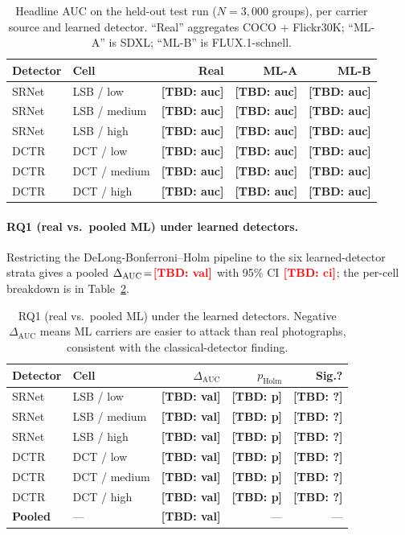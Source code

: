 \documentclass[10pt,twocolumn,a4paper]{article}
\newcommand{\TBD}[1]{\textbf{\color{red}[TBD: #1]}}
\begin{document}
\begin{table}[h]
\centering\small
\caption{Headline AUC on the held-out test run ($N\!=\!3{,}000$ groups), per carrier source and learned detector. ``Real'' aggregates COCO + Flickr30K; ``ML-A'' is SDXL; ``ML-B'' is FLUX.1-schnell.}
\label{tab:learned-headline-auc}
\setlength{\tabcolsep}{6pt}\renewcommand{\arraystretch}{1.1}
\begin{tabular}{@{}llrrr@{}}
\toprule
\textbf{Detector} & \textbf{Cell} & \textbf{Real} & \textbf{ML-A} & \textbf{ML-B} \\
\midrule
SRNet & LSB / low     & \TBD{auc} & \TBD{auc} & \TBD{auc} \\
SRNet & LSB / medium  & \TBD{auc} & \TBD{auc} & \TBD{auc} \\
SRNet & LSB / high    & \TBD{auc} & \TBD{auc} & \TBD{auc} \\
DCTR  & DCT / low     & \TBD{auc} & \TBD{auc} & \TBD{auc} \\
DCTR  & DCT / medium  & \TBD{auc} & \TBD{auc} & \TBD{auc} \\
DCTR  & DCT / high    & \TBD{auc} & \TBD{auc} & \TBD{auc} \\
\bottomrule
\end{tabular}
\end{table}

\paragraph{RQ1 (real vs.\ pooled ML) under learned detectors.} Restricting the DeLong-Bonferroni--Holm pipeline to the six learned-detector strata gives a pooled $\Delta_\text{AUC}\!=\!\TBD{val}$ with 95\% CI $\TBD{ci}$; the per-cell breakdown is in Table~\ref{tab:learned-rq1}.

\begin{table}[h]
\centering\small
\caption{RQ1 (real vs.\ pooled ML) under the learned detectors. Negative $\Delta_\text{AUC}$ means ML carriers are easier to attack than real photographs, consistent with the classical-detector finding.}
\label{tab:learned-rq1}
\setlength{\tabcolsep}{4pt}\renewcommand{\arraystretch}{1.1}
\begin{tabular}{@{}llrrr@{}}
\toprule
\textbf{Detector} & \textbf{Cell} & \textbf{$\Delta_\text{AUC}$} & \textbf{$p_\text{Holm}$} & \textbf{Sig.?} \\
\midrule
SRNet & LSB / low     & \TBD{val} & \TBD{p} & \TBD{?} \\
SRNet & LSB / medium  & \TBD{val} & \TBD{p} & \TBD{?} \\
SRNet & LSB / high    & \TBD{val} & \TBD{p} & \TBD{?} \\
DCTR  & DCT / low     & \TBD{val} & \TBD{p} & \TBD{?} \\
DCTR  & DCT / medium  & \TBD{val} & \TBD{p} & \TBD{?} \\
DCTR  & DCT / high    & \TBD{val} & \TBD{p} & \TBD{?} \\
\midrule
\textbf{Pooled}       & --- & \TBD{val} & --- & --- \\
\bottomrule
\end{tabular}
\end{table}
\end{document}
